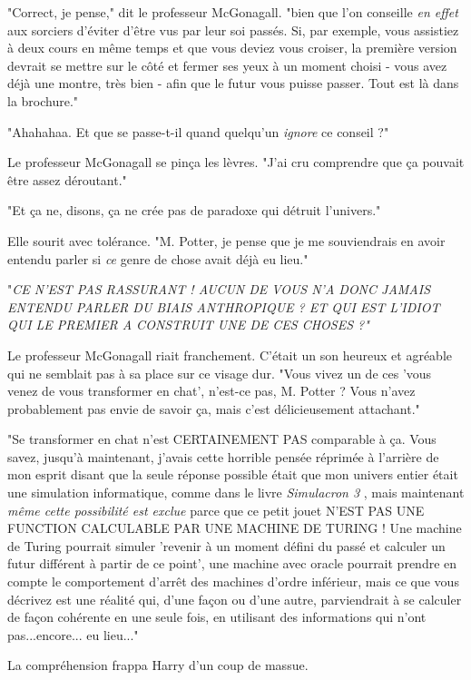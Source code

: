 "Correct, je pense," dit le professeur McGonagall. "bien que l'on conseille \emph{en effet}  aux sorciers d'éviter d'être vus par leur soi passés. Si, par exemple, vous assistiez à deux cours en même temps et que vous deviez vous croiser, la première version devrait se mettre sur le côté et fermer ses yeux à un moment choisi - vous avez déjà une montre, très bien - afin que le futur vous puisse passer. Tout est là dans la brochure."

"Ahahahaa. Et que se passe-t-il quand quelqu'un \emph{ignore}  ce conseil ?"

Le professeur McGonagall se pinça les lèvres. "J'ai cru comprendre que ça pouvait être assez déroutant."

"Et ça ne, disons, ça ne crée pas de paradoxe qui détruit l'univers."

Elle sourit avec tolérance. "M. Potter, je pense que je me souviendrais en avoir entendu parler si \emph{ce}  genre de chose avait déjà eu lieu."

"\emph{CE N'EST PAS RASSURANT ! AUCUN DE VOUS N'A DONC JAMAIS ENTENDU PARLER DU BIAIS ANTHROPIQUE ? ET QUI EST L'IDIOT QUI LE PREMIER A CONSTRUIT UNE DE CES CHOSES ?"} 

Le professeur McGonagall riait franchement. C'était un son heureux et agréable qui ne semblait pas à sa place sur ce visage dur. "Vous vivez un de ces 'vous venez de vous transformer en chat', n'est-ce pas, M. Potter ? Vous n'avez probablement pas envie de savoir ça, mais c'est délicieusement attachant."

"Se transformer en chat n'est CERTAINEMENT PAS comparable à ça. Vous savez, jusqu'à maintenant, j'avais cette horrible pensée réprimée à l'arrière de mon esprit disant que la seule réponse possible était que mon univers entier était une simulation informatique, comme dans le livre \emph{Simulacron 3} , mais maintenant \emph{même cette possibilité est exclue}  parce que ce petit jouet N'EST PAS UNE FUNCTION CALCULABLE PAR UNE MACHINE DE TURING ! Une machine de Turing pourrait simuler 'revenir à un moment défini du passé et calculer un futur différent à partir de ce point', une machine avec oracle pourrait prendre en compte le comportement d'arrêt des machines d'ordre inférieur, mais ce que vous décrivez est une réalité qui, d'une façon ou d'une autre, parviendrait à se calculer de façon cohérente en une seule fois, en utilisant des informations qui n'ont pas...encore... eu lieu..."

La compréhension frappa Harry d'un coup de massue.

